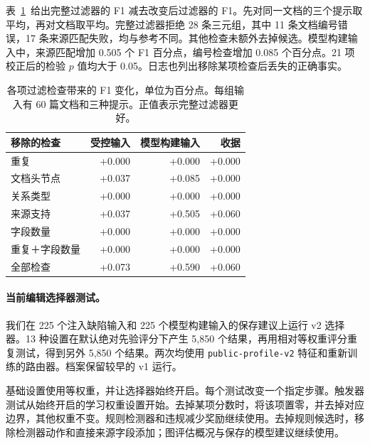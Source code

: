 表~\ref{tab:gate_checks}~给出完整过滤器的 F1 减去改变后过滤器的 F1。先对同一文档的三个提示取平均，再对文档取平均。完整过滤器拒绝 28 条三元组，其中 11 条文档编号错误，17 条来源匹配失败，均与参考不同。其他检查未额外去掉候选。模型构建输入中，来源匹配增加 0.505 个 F1 百分点，编号检查增加 0.085 个百分点。21 项校正后的检验 $p$ 值均大于 0.05。日志也列出移除某项检查后丢失的正确事实。

\begin{table}[t]
\centering
\caption{各项过滤检查带来的 F1 变化，单位为百分点。每组输入有 60 篇文档和三种提示。正值表示完整过滤器更好。}
\label{tab:gate_checks}
\small
\begin{tabular}{lrrr}
\toprule
移除的检查 & 受控输入 & 模型构建输入 & 收据 \\
\midrule
重复 & +0.000 & +0.000 & +0.000 \\
文档头节点 & +0.037 & +0.085 & +0.000 \\
关系类型 & +0.000 & +0.000 & +0.000 \\
来源支持 & +0.037 & +0.505 & +0.060 \\
字段数量 & +0.000 & +0.000 & +0.000 \\
重复＋字段数量 & +0.000 & +0.000 & +0.000 \\
全部检查 & +0.073 & +0.590 & +0.060 \\
\bottomrule
\end{tabular}
\end{table}

\paragraph{当前编辑选择器测试。}

我们在 225 个注入缺陷输入和 225 个模型构建输入的保存建议上运行 v2 选择器。13 种设置在默认绝对先验评分下产生 5,850 个结果，再用相对等权重评分重复测试，得到另外 5,850 个结果。两次均使用 \texttt{public-profile-v2} 特征和重新训练的路由器。档案保留较早的 v1 运行。

基础设置使用等权重，并让选择器始终开启。每个测试改变一个指定步骤。触发器测试从始终开启的学习权重设置开始。去掉某项分数时，将该项置零，并去掉对应边界，其他权重不变。规则检测器和违规减少奖励继续使用。去掉规则候选时，移除检测器动作和直接来源字段添加；图评估概况与保存的模型建议继续使用。

